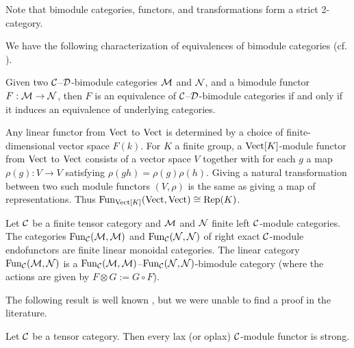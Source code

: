 \documentclass{amsart}
\begin{document}
%
\nid Note that bimodule categories, functors, and transformations form a strict 2-category.  %
 
 
 We have the following characterization of equivalences of bimodule categories (cf. \cite{MR2664622}). 
 
\begin{lemma} \label{lem:Recog_equiv_of_bimod}
	Given two $\mathcal C$--$\mathcal D$-bimodule categories $\mathcal M$ and $\mathcal N$, and a bimodule functor $F:\mathcal M \to \mathcal N$, then $F$ is an equivalence of $\mathcal C$--$\mathcal D$-bimodule categories if and only if it induces an equivalence of underlying categories.
\end{lemma}

\begin{example}
Any linear functor from $\mathrm{Vect}$ to $\mathrm{Vect}$ is determined by a choice of finite-dimensional vector space $F(k)$.  For $K$ a finite group, a $\mathrm{Vect}[K]$-module functor from $\mathrm{Vect}$ to $\mathrm{Vect}$ consists of a vector space $V$ together with for each $g$ a map $\rho(g): V \rightarrow V$ satisfying $\rho(gh) = \rho(g)\rho(h)$.  Giving a natural transformation between two such module functors $(V, \rho)$ is the same as giving a map of representations.  Thus $\operatorname{Fun}_{\mathrm{Vect}[K]}(\mathrm{Vect}, \mathrm{Vect}) \cong \mathrm{Rep}(K)$.
\end{example}

\begin{example}
	Let $\mathcal C$ be a finite tensor category and $\mathcal M$ and $\mathcal N$ finite left $\mathcal C$-module categories. The categories $\operatorname{Fun}_{\mathcal C}(\mathcal M, \mathcal M)$ and $\operatorname{Fun}_{\mathcal C}(\mathcal N, \mathcal N)$ of right exact $\mathcal C$-module endofunctors are finite linear monoidal categories.   
	The linear category $\operatorname{Fun}_{\mathcal C}(\mathcal M, \mathcal N)$ is a $\operatorname{Fun}_{\mathcal C}(\mathcal M, \mathcal M)$--$\operatorname{Fun}_{\mathcal C}(\mathcal N, \mathcal N)$-bimodule category (where the actions are given by $F \otimes G := G \circ F$). 
\end{example}


The following result is well known \cite[Rmk 4]{MR1976459}, but we were unable to find a proof in the literature.

\begin{lemma} \label{lem:laxisstrong}
	Let $\mathcal C$ be a tensor category. Then every lax (or oplax) $\mathcal C$-module functor is strong.  
\end{lemma} 
\end{document}
